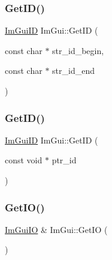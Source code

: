 \subsubsection{\texorpdfstring{Get\+I\+D()}{GetID()}\hspace{0.1cm}{\footnotesize\ttfamily [2/3]}}
{\footnotesize\ttfamily \mbox{\hyperlink{imgui_8h_a1785c9b6f4e16406764a85f32582236f}{Im\+Gui\+ID}} Im\+Gui\+::\+Get\+ID (\begin{DoxyParamCaption}\item[{const char $\ast$}]{str\+\_\+id\+\_\+begin,  }\item[{const char $\ast$}]{str\+\_\+id\+\_\+end }\end{DoxyParamCaption})}

\mbox{\label{namespace_im_gui_a220123ad62c2180ded92b2ef91f27c5a}} 
\subsubsection{\texorpdfstring{Get\+I\+D()}{GetID()}\hspace{0.1cm}{\footnotesize\ttfamily [3/3]}}
{\footnotesize\ttfamily \mbox{\hyperlink{imgui_8h_a1785c9b6f4e16406764a85f32582236f}{Im\+Gui\+ID}} Im\+Gui\+::\+Get\+ID (\begin{DoxyParamCaption}\item[{const void $\ast$}]{ptr\+\_\+id }\end{DoxyParamCaption})}

\mbox{\label{namespace_im_gui_a3179e560812f878f3961ce803a5d9302}} 
\subsubsection{\texorpdfstring{Get\+I\+O()}{GetIO()}}
{\footnotesize\ttfamily \mbox{\hyperlink{struct_im_gui_i_o}{Im\+Gui\+IO}} \& Im\+Gui\+::\+Get\+IO (\begin{DoxyParamCaption}{ }\end{DoxyParamCaption})}

\mbox{\label{namespace_im_gui_a3d260209b8dc25a2c942e8cfd1ed0e51}} 
